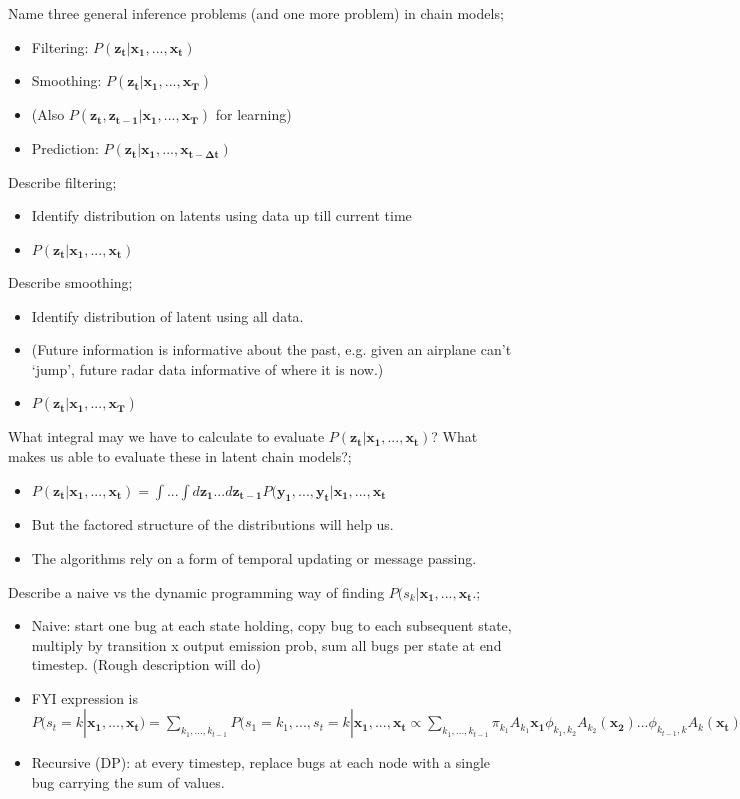 \documentclass{article}
\begin{document}
Name three general inference problems (and one more problem) in chain models; \begin{itemize} \item Filtering: $P(\mathbf{z_t|x_1,...,x_t})$ \item Smoothing: $P(\mathbf{z_t|x_1,...,x_T})$  \item (Also $P(\mathbf{z_t, z_{t-1}|x_1,...,x_T})$ for learning) \item Prediction: $P(\mathbf{z_t|x_1,...,x_{t-\Delta t}})$ \end{itemize}

Describe filtering; \begin{itemize} \item Identify distribution on latents using data up till current time \item  $P(\mathbf{z_t|x_1,...,x_t})$ \end{itemize}

Describe smoothing; \begin{itemize} \item Identify distribution of latent using all data. \item (Future information is informative about the past, e.g. given an airplane can't `jump', future radar data informative of where it is now.) \item $P(\mathbf{z_t|x_1,...,x_T})$ \end{itemize}

What integral may we have to calculate to evaluate $P(\mathbf{z_t|x_1,...,x_t})$? What makes us able to evaluate these in latent chain models?; \begin{itemize} \item $P(\mathbf{z_t|x_1,...,x_t}) = \int ...\int d\mathbf{z_1}...d\mathbf{z_{t-1}}P(\mathbf{y_1},...,\mathbf{y_t}|\mathbf{x_1},...,\mathbf{x_t}$ \item But the factored structure of the distributions will help us. \item The algorithms rely on a form of temporal updating or message passing. \end{itemize}

Describe a naive vs the dynamic programming way of finding $P(s_k|\mathbf{x_1,...,x_t}$.; \begin{itemize} \item Naive: start one bug at each state holding, copy bug to each subsequent state, multiply by transition x output emission prob, sum all bugs per state at end timestep. (Rough description will do) \item FYI expression is $P(s_t=k|\mathbf{x_1,...,x_t})=\sum_{k_1, ..., k_{t-1}}P(s_1=k_1,...,s_t=k|\mathbf{x_1,...,x_t}\propto\sum_{k_1,...,k_{t-1}}\pi_{k_1}A_{k_1}\mathbf{x_1}\phi_{k_1,k_2}A_{k_2}(\mathbf{x_2})...\phi_{k_{t-1},k}A_k(\mathbf{x_t})$ \item Recursive (DP): at every timestep, replace bugs at each node with a single bug carrying the sum of values. \end{itemize}
\end{document}
